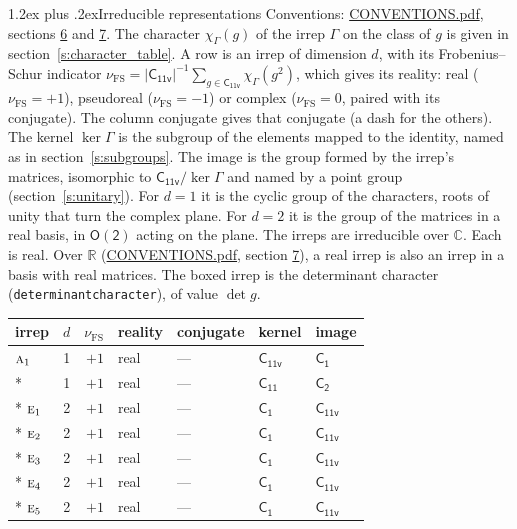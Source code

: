 \documentclass[10pt,a4paper]{article}
\makeatletter
\renewcommand\section{\@startsection{section}{1}{\z@}{-3ex plus -1ex minus -.2ex}%
  {1.2ex plus .2ex}{\normalfont\large\sffamily\bfseries\color{parttitle}}}
\numberwithin{equation}{section}
\newcommand{\grp}[1]{\mathsf{#1}}
\newcommand{\irr}[1]{\text{\normalfont\scshape #1}}
\newcommand{\detbox}[1]{{\setlength{\fboxsep}{1pt}\fbox{#1}}}
\newcommand{\irchar}[1]{\chi_{#1}}
\newcommand{\fsind}{\nu_{\mathrm{FS}}}
\makeatother
\begin{document}
\section{Irreducible representations}\label{s:irreps}
Conventions: \href{../../CONVENTIONS.pdf}{CONVENTIONS.pdf}, sections \href{../../CONVENTIONS.pdf\#conv.6}{6} and \href{../../CONVENTIONS.pdf\#conv.7}{7}.
\leavevmode\label{n:function.character}\label{n:irrep.Gamma}The character $\irchar{\Gamma}(g)$ of the irrep $\Gamma$ on the class of $g$ is given in section~\ref{s:character_table}.
\leavevmode\label{n:index.dimension}\label{n:index.frobenius}\label{n:head.irrep}\label{n:head.reality}A row is an irrep of dimension $d$, with its Frobenius--Schur indicator $\fsind = |\grp{C_{11v}}|^{-1}\allowbreak\sum_{g\in\grp{C_{11v}}}\irchar{\Gamma}(g^2)$, which gives its reality: real ($\fsind = +1$), pseudoreal ($\fsind = -1$) or complex ($\fsind = 0$, paired with its conjugate). \label{n:head.conjugate}The column conjugate gives that conjugate (a dash for the others). \label{n:head.kernel}The kernel $\ker\Gamma$ is the subgroup of the elements mapped to the identity, named as in section~\ref{s:subgroups}. \label{n:head.image}The image is the group formed by the irrep's matrices, isomorphic to $\grp{C_{11v}}/\ker\Gamma$ and named by a point group (section~\ref{s:unitary}). For $d = 1$ it is the cyclic group of the characters, roots of unity that turn the complex plane. For $d = 2$ it is the group of the matrices in a real basis, in $\grp{O(2)}$ acting on the plane. The irreps are irreducible over $\mathbb{C}$. Each is real. Over $\mathbb{R}$ (\href{../../CONVENTIONS.pdf}{CONVENTIONS.pdf}, section \href{../../CONVENTIONS.pdf\#conv.7}{7}), a real irrep is also an irrep in a basis with real matrices. \label{n:mark.determinant}The boxed irrep is the determinant character (\texttt{determinantcharacter}), of value $\det g$.
\setlength{\emergencystretch}{2em}\par\setlength{\emergencystretch}{0pt}
{\small\renewcommand{\arraystretch}{1.25}\begin{longtable}{@{}lrrllll@{}}\toprule
irrep & $d$ & $\fsind$ & reality & conjugate & kernel & image\\\midrule\endhead
\bottomrule\endfoot\endlastfoot
$\irr{a}_{1}$ & 1 & $+1$ & real & --- & \href{C11v.pdf}{$\grp{C_{11v}}$} & \href{C1.pdf}{$\grp{C_{1}}$}\\*
\detbox{$\irr{a}_{2}$} & 1 & $+1$ & real & --- & \href{C11.pdf}{$\grp{C_{11}}$} & \href{C2.pdf}{$\grp{C_{2}}$}\\*
$\irr{e}_{1}$ & 2 & $+1$ & real & --- & \href{C1.pdf}{$\grp{C_{1}}$} & \href{C11v.pdf}{$\grp{C_{11v}}$}\\*
$\irr{e}_{2}$ & 2 & $+1$ & real & --- & \href{C1.pdf}{$\grp{C_{1}}$} & \href{C11v.pdf}{$\grp{C_{11v}}$}\\*
$\irr{e}_{3}$ & 2 & $+1$ & real & --- & \href{C1.pdf}{$\grp{C_{1}}$} & \href{C11v.pdf}{$\grp{C_{11v}}$}\\*
$\irr{e}_{4}$ & 2 & $+1$ & real & --- & \href{C1.pdf}{$\grp{C_{1}}$} & \href{C11v.pdf}{$\grp{C_{11v}}$}\\*
$\irr{e}_{5}$ & 2 & $+1$ & real & --- & \href{C1.pdf}{$\grp{C_{1}}$} & \href{C11v.pdf}{$\grp{C_{11v}}$}\\
\bottomrule\end{longtable}}
\end{document}
